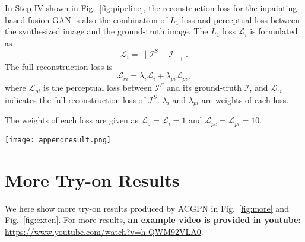 \documentclass[10pt,twocolumn,letterpaper]{article}
\begin{document}
In Step IV shown in Fig.~\ref{fig:pipeline}, the reconstruction loss for the inpainting based fusion GAN is also the combination of $L_1$ loss and perceptual loss between the synthesized image and the ground-truth image. The $L_1$ loss $\mathcal{L}_i$ is formulated as
\begin{equation}
    \mathcal{L}_i=\lVert \mathcal{I}^S\!-\!\mathcal{I} \rVert_1.
\end{equation}
The full reconstruction loss is
\begin{equation}
     \mathcal{L}_{ri}= \lambda_{i}\mathcal{L}_i+\lambda_{pi} \mathcal{L}_{pi},
\end{equation}
where $\mathcal{L}_{pi}$ is the perceptual loss between $\mathcal{I}^S$ and its ground-truth $\mathcal{I}$, and $ \mathcal{L}_{ri}$ indicates the full reconstruction loss of $\mathcal{I}^S$.  $\lambda_{i}$ and $\lambda_{pi}$ are weights of each loss.

The weights of each loss are given as $\mathcal{L}_{o}\!=\!\mathcal{L}_{i}\!=\!1$ and $\mathcal{L}_{pc}\!=\!\mathcal{L}_{pi}\!=\!10$.
\begin{figure*}[htb]
\begin{center}
\texttt{[image: appendresult.png]}
\end{center}
   \caption{Extensive try-on results with four reference people. ACGPN perform robustly with various poses including occlusions and cross-arms. Artifacts are reduced to the minimum.
}
\label{fig:exten}
\end{figure*}
\section{More Try-on Results}
We here show more try-on results produced by ACGPN in Fig.~\ref{fig:more} and Fig.~\ref{fig:exten}. For more results, \textbf{an example video is provided in youtube}:
\url{https://www.youtube.com/watch?v=h-QWM92VLA0}.






\clearpage{}
\end{document}
